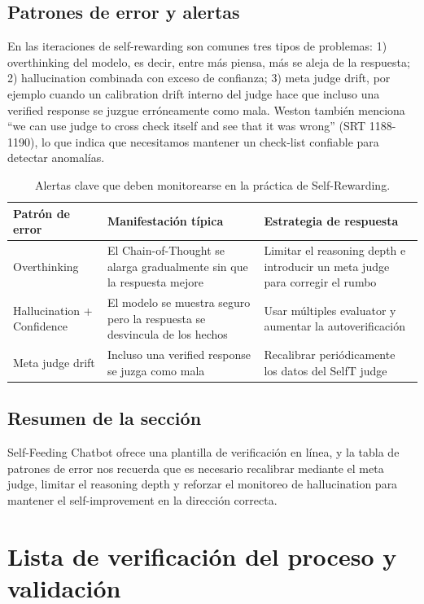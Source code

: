 \documentclass[a4paper]{article}
\begin{document}
\subsection{Patrones de error y alertas}
En las iteraciones de self-rewarding son comunes tres tipos de problemas: 1) overthinking del modelo, es decir, entre más piensa, más se aleja de la respuesta; 2) hallucination combinada con exceso de confianza; 3) meta judge drift, por ejemplo cuando un calibration drift interno del judge hace que incluso una verified response se juzgue erróneamente como mala. Weston también menciona ``we can use judge to cross check itself and see that it was wrong'' (SRT 1188-1190), lo que indica que necesitamos mantener un check-list confiable para detectar anomalías.

\begin{table}[H]
\centering
\begin{tabular}{p{4cm}p{5cm}p{5cm}}
\toprule
Patrón de error & Manifestación típica & Estrategia de respuesta \\
\midrule
Overthinking & El Chain-of-Thought se alarga gradualmente sin que la respuesta mejore & Limitar el reasoning depth e introducir un meta judge para corregir el rumbo \\
Hallucination + Confidence & El modelo se muestra seguro pero la respuesta se desvincula de los hechos & Usar múltiples evaluator y aumentar la autoverificación \\
Meta judge drift & Incluso una verified response se juzga como mala & Recalibrar periódicamente los datos del SelfT judge \\
\bottomrule
\end{tabular}
\caption{Alertas clave que deben monitorearse en la práctica de Self-Rewarding.}
\end{table}

\subsection{Resumen de la sección}
Self-Feeding Chatbot ofrece una plantilla de verificación en línea, y la tabla de patrones de error nos recuerda que es necesario recalibrar mediante el meta judge, limitar el reasoning depth y reforzar el monitoreo de hallucination para mantener el self-improvement en la dirección correcta.

\section{Lista de verificación del proceso y validación}
\end{document}
